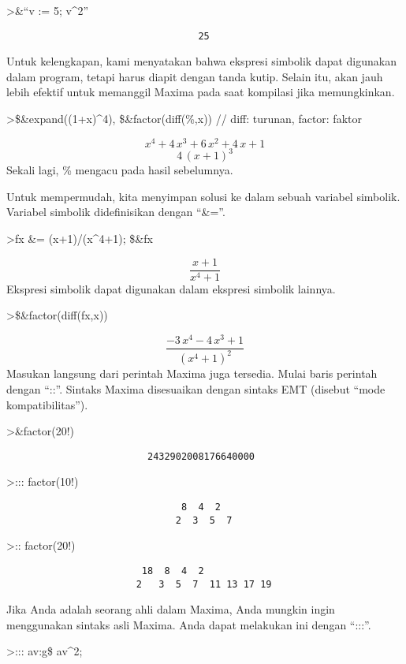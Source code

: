 \documentclass[
]{book}
\begin{document}
\textgreater\&``v := 5; v\^{}2''

\begin{verbatim}
                                  25
\end{verbatim}

Untuk kelengkapan, kami menyatakan bahwa ekspresi simbolik dapat digunakan dalam program, tetapi harus diapit dengan tanda kutip. Selain itu, akan jauh lebih efektif untuk memanggil Maxima pada saat kompilasi jika memungkinkan.

\textgreater\$\&expand((1+x)\^{}4), \$\&factor(diff(\%,x)) // diff: turunan, factor: faktor

\[x^4+4\,x^3+6\,x^2+4\,x+1\]\[4\,\left(x+1\right)^3\]Sekali lagi, \% mengacu pada hasil sebelumnya.

Untuk mempermudah, kita menyimpan solusi ke dalam sebuah variabel simbolik. Variabel simbolik didefinisikan dengan ``\&=''.

\textgreater fx \&= (x+1)/(x\^{}4+1); \$\&fx

\[\frac{x+1}{x^4+1}\]Ekspresi simbolik dapat digunakan dalam ekspresi simbolik lainnya.

\textgreater\$\&factor(diff(fx,x))

\[\frac{-3\,x^4-4\,x^3+1}{\left(x^4+1\right)^2}\]Masukan langsung dari perintah Maxima juga tersedia. Mulai baris perintah dengan ``::''. Sintaks Maxima disesuaikan dengan sintaks EMT (disebut ``mode kompatibilitas'').

\textgreater\&factor(20!)

\begin{verbatim}
                         2432902008176640000
\end{verbatim}

\textgreater::: factor(10!)

\begin{verbatim}
                               8  4  2
                              2  3  5  7
\end{verbatim}

\textgreater:: factor(20!)

\begin{verbatim}
                        18  8  4  2
                       2   3  5  7  11 13 17 19
\end{verbatim}

Jika Anda adalah seorang ahli dalam Maxima, Anda mungkin ingin menggunakan sintaks asli Maxima. Anda dapat melakukan ini dengan ``:::''.

\textgreater::: av:g\$ av\^{}2;
\end{document}
